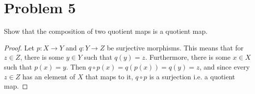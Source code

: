 \documentclass[fontsize=11pt]{scrartcl} %
\numberwithin{equation}{section} %
\numberwithin{figure}{section} %
\numberwithin{table}{section} %
\begin{document}
\section*{Problem 5}
Show that the composition of two quotient maps is a quotient map.
\\
\begin{proof}
Let $p:X\to Y$ and $q:Y\to Z$ be surjective morphisms. This means that for $z\in
    Z$, there is some $y\in Y$ such that $q(y)=z$. Furthermore, there is some
    $x\in X$ such that $p(x) = y$. Then $q\circ p (x) = q(p(x)) = q(y) = z$, and
    since every $z\in Z$ has an element of $X$ that maps to it, $q\circ p$ is a
    surjection i.e. a quotient map.
\end{proof}
\pagebreak
\end{document}
